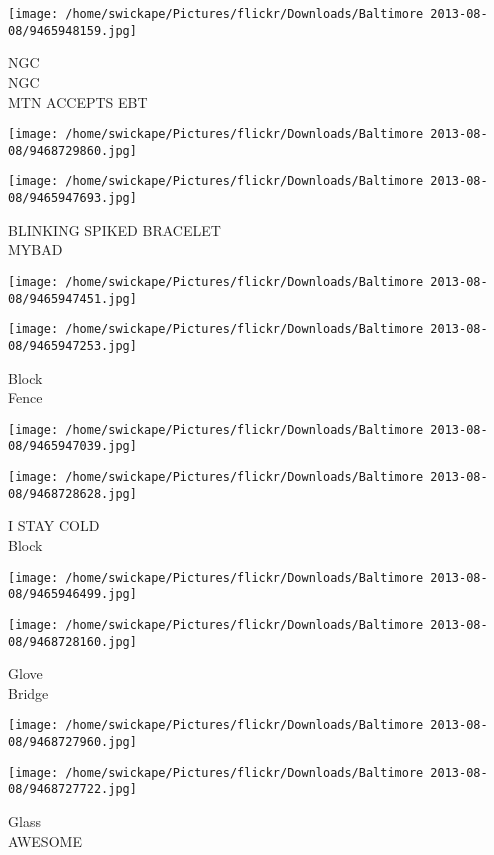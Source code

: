 \documentclass[10pt,letterpaper]{article}
\begin{document}
\texttt{[image: /home/swickape/Pictures/flickr/Downloads/Baltimore 2013-08-08/9465948159.jpg]}

NGC\\
NGC\\
MTN ACCEPTS EBT
\pagebreak

\texttt{[image: /home/swickape/Pictures/flickr/Downloads/Baltimore 2013-08-08/9468729860.jpg]}

\vspace{0.25in}
\texttt{[image: /home/swickape/Pictures/flickr/Downloads/Baltimore 2013-08-08/9465947693.jpg]}

BLINKING SPIKED BRACELET\\
MYBAD
\pagebreak

\texttt{[image: /home/swickape/Pictures/flickr/Downloads/Baltimore 2013-08-08/9465947451.jpg]}

\vspace{0.25in}
\texttt{[image: /home/swickape/Pictures/flickr/Downloads/Baltimore 2013-08-08/9465947253.jpg]}

Block\\
Fence
\pagebreak

\texttt{[image: /home/swickape/Pictures/flickr/Downloads/Baltimore 2013-08-08/9465947039.jpg]}

\vspace{0.25in}
\texttt{[image: /home/swickape/Pictures/flickr/Downloads/Baltimore 2013-08-08/9468728628.jpg]}

I STAY COLD\\
Block
\pagebreak

\texttt{[image: /home/swickape/Pictures/flickr/Downloads/Baltimore 2013-08-08/9465946499.jpg]}

\vspace{0.25in}
\texttt{[image: /home/swickape/Pictures/flickr/Downloads/Baltimore 2013-08-08/9468728160.jpg]}

Glove\\
Bridge
\pagebreak

\texttt{[image: /home/swickape/Pictures/flickr/Downloads/Baltimore 2013-08-08/9468727960.jpg]}

\vspace{0.25in}
\texttt{[image: /home/swickape/Pictures/flickr/Downloads/Baltimore 2013-08-08/9468727722.jpg]}

Glass\\
AWESOME
\pagebreak
\end{document}
